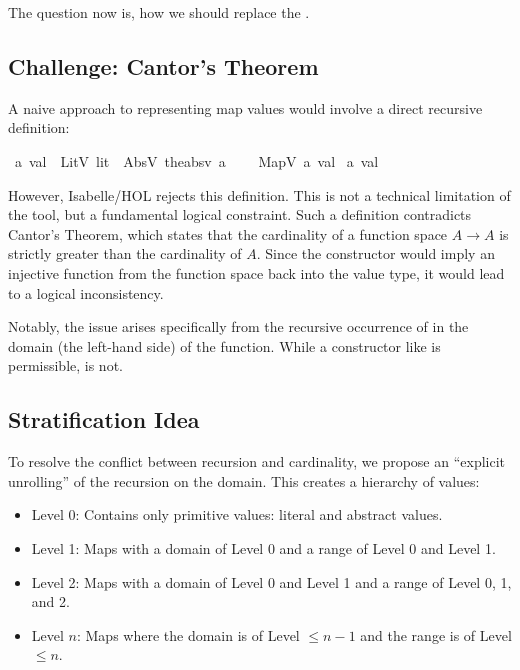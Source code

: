 The question now is, how we should replace the .

\subsection{Challenge: Cantor's Theorem}
\label{sec:cantor}

A naive approach to representing map values would involve a direct recursive definition:

\begin{isabellebody}\isanewline
{}\isamarkupfalse%
\ {\isacharprime}{\kern0pt}a{\kern0pt}\ val\ {\isacharequal}{\kern0pt}\ LitV\ lit\ {\isacharbar}{\kern0pt}\ AbsV\ {\isacharparenleft}{\kern0pt}the{\isacharunderscore}{\kern0pt}absv{\isacharcolon}{\kern0pt}\ {\isacharprime}{\kern0pt}a{\isacharparenright}{\kern0pt}
\isanewline\ \ \ {\isacharbar}{\kern0pt}\ MapV\ 
{\isachardoublequoteopen}{\isacharprime}{\kern0pt}a{\kern0pt}\ val\ {\isasymRightarrow}
{\isacharprime}{\kern0pt}a{\kern0pt}\ val{\isachardoublequoteopen}
\end{isabellebody}


However, Isabelle/HOL rejects this definition.
This is not a technical limitation of the tool, but a fundamental logical constraint.
Such a definition contradicts Cantor's Theorem,
which states that the cardinality of a function space $A \to A$ is strictly greater than the cardinality of $A$.
Since the constructor \isa{MapV} would imply an injective function from the function space back into the value type,
it would lead to a logical inconsistency.

Notably, the issue arises specifically from the recursive occurrence of  in the domain (the left-hand side) of the function.
While a constructor like \isa{bool {\isasymRightarrow} 'a val} is permissible, 
\isa{'a val {\isasymRightarrow} bool} is not.

\subsection{Stratification Idea}
\label{sec:stratification-solution}
To resolve the conflict between recursion and cardinality, we propose an ``explicit unrolling'' of the recursion on the domain.
This creates a hierarchy of values:

\begin{itemize}
  \item Level 0: Contains only primitive values: literal and abstract values.
  \item Level 1: Maps with a domain of Level 0 and a range of Level 0 and Level 1.
  \item Level 2: Maps with a domain of Level 0 and Level 1 and a range of Level 0, 1, and 2.
  \item Level $n$: Maps where the domain is of Level $\le n-1$ and the range is of Level $\le n$.
\end{itemize}


